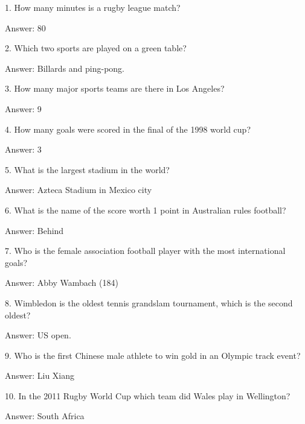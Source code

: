 \documentclass{beamer}
\begin{document}
    \begin{frame}
        1. How many minutes is a rugby league match?

        Answer: 80
    \end{frame}

    \begin{frame}
        2. Which two sports are played on a green table?

        Answer: Billards and ping-pong.
    \end{frame}

    \begin{frame}
        3. How many major sports teams are there in Los Angeles?

        Answer: 9
    \end{frame}

    \begin{frame}
        4. How many goals were scored in the final of the 1998 world cup?

        Answer: 3
    \end{frame}

    \begin{frame}
        5. What is the largest stadium in the world?

        Answer: Azteca Stadium in Mexico city
    \end{frame}

    \begin{frame}
        6. What is the name of the score worth 1 point in Australian rules
        football?

        Answer: Behind
    \end{frame}

    \begin{frame}
        7. Who is the female association football player with the most
        international goals?

        Answer: Abby Wambach (184)
    \end{frame}

    \begin{frame}
        8. Wimbledon is the oldest tennis grandslam tournament, which is the
        second oldest?

        Answer: US open.
    \end{frame}

    \begin{frame}
        9. Who is the first Chinese male athlete to win gold in an Olympic track
        event?

        Answer: Liu Xiang
    \end{frame}

    \begin{frame}
        10. In the 2011 Rugby World Cup which team did Wales play in Wellington?

        Answer: South Africa
    \end{frame}
\end{document}
